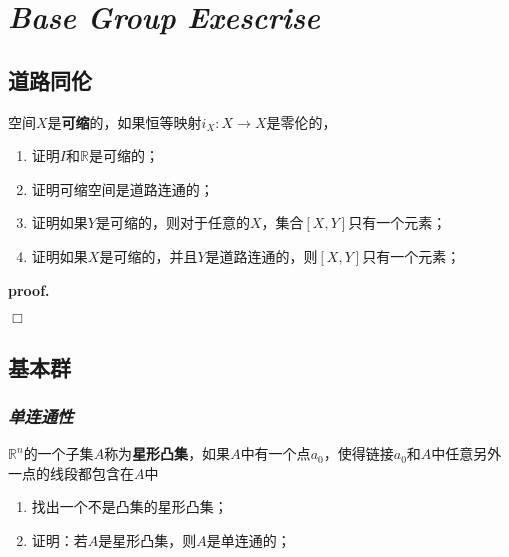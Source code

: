 \chapter{\textsl{Base Group Exescrise}}

\section{道路同伦}

\begin{mdframed}
    \begin{question}
        空间$X$是\textbf{可缩}的，如果恒等映射$i_X:X\rightarrow X$是零伦的，
        \begin{enumerate}[itemindent=2em]
            \item 证明$I$和$\mathbb{R}$是可缩的；
            \item 证明可缩空间是道路连通的；
            \item 证明如果$Y$是可缩的，则对于任意的$X$，集合$[X,Y]$只有一个元素；
            \item 证明如果$X$是可缩的，并且$Y$是道路连通的，则$[X,Y]$只有一个元素；
        \end{enumerate}
    \end{question}
\end{mdframed}

\textbf{proof.}

$\Box$

\section{基本群}

\subsection*{\textsl{单连通性}}

\begin{mdframed}
    \begin{question}
        $\mathbb{R}^n$的一个子集$A$称为\textbf{星形凸集}，如果$A$中有一个点$a_0$，使得链接$a_0$和$A$中任意另外一点的线段都包含在$A$中
        \begin{enumerate}[itemindent=2em]
            \item 找出一个不是凸集的星形凸集；
            \item 证明：若$A$是星形凸集，则$A$是单连通的；
        \end{enumerate}
    \end{question}
\end{mdframed}

